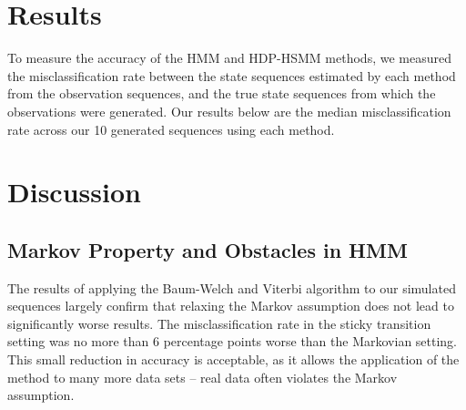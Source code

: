 \documentclass{article}
\begin{document}
\section{Results}

To measure the accuracy of the HMM and HDP-HSMM methods, we measured the misclassification rate between the state sequences estimated by each method from the observation sequences, and the true state sequences from which the observations were generated. Our results below are the median misclassification rate across our 10 generated sequences using each method.

\begin{table}[H]	
	\centering
	
\end{table}


\section{Discussion}

\subsection{Markov Property and Obstacles in HMM}

The results of applying the Baum-Welch and Viterbi algorithm to our simulated sequences largely confirm that relaxing the Markov assumption does not lead to significantly worse results. The misclassification rate in the sticky transition setting was no more than 6 percentage points worse than the Markovian setting. This small reduction in accuracy is acceptable, as it allows the application of the method to many more data sets -- real data often violates the Markov assumption.
\end{document}
